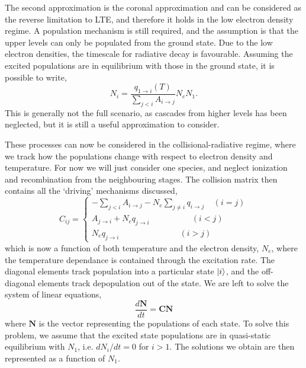 The second approximation is the coronal approximation and can be considered as the reverse limitation to LTE, and therefore it holds in the low electron density regime. A population mechanism is still required, and the assumption is that the upper levels can only be populated from the ground state. Due to the low electron densities, the timescale for radiative decay is favourable. Assuming the excited populations are in equilibrium with those in the ground state, it is possible to write, 
\begin{equation}\label{eq:spe_coronal}
N_i = \frac{q_{1\rightarrow i}(T)}{\sum_{j < i}A_{i\rightarrow j}}N_eN_1.
\end{equation}
This is generally not the full scenario, as cascades from higher levels has been neglected, but it is still a useful approximation to consider.

These processes can now be considered in the collisional-radiative regime, where we track how the populations change with respect to electron density and temperature. For now we will just consider one species, and neglect ionization and recombination from the neighbouring stages. The collision matrix then contains all the `driving' mechanisms discussed,
\begin{equation}\label{eq:spe_cmatrix}
C_{ij} = \left\{
  \begin{array}{lr}
   -\sum_{j<i}A_{i\rightarrow j} - N_e\sum_{j\ne i} q_{i\rightarrow j} ~~~~~ (i=j)\\
   A_{j \rightarrow i} + N_eq_{j\rightarrow i} ~~~~~~~~~~~~~~~~~~~~~~~(i<j)\\
   N_eq_{j\rightarrow i} ~~~~~~~~~~~~~~~~~~~~~~~~~~~~~~~~~(i>j)
 \end{array}
 \right.
\end{equation}
which is now a function of both temperature and the electron density, $N_e$, where the temperature dependance is contained through the excitation rate. The diagonal elements track population into a particular state $\Ket{i}$, and the off-diagonal elements track depopulation out of the state. We are left to solve the system of linear equations,
\begin{equation}\label{eq:spe_axb}
\frac{d \boldsymbol{N}}{dt} = \boldsymbol{CN}
\end{equation}
where $\boldsymbol{N}$ is the vector representing the populations of each state. To solve this problem, we assume that the excited state populations are in quasi-static equilibrium with $N_1$, i.e. $d N_i / dt = 0$ for $i > 1$. The solutions we obtain are then represented as a function of $N_1$.

